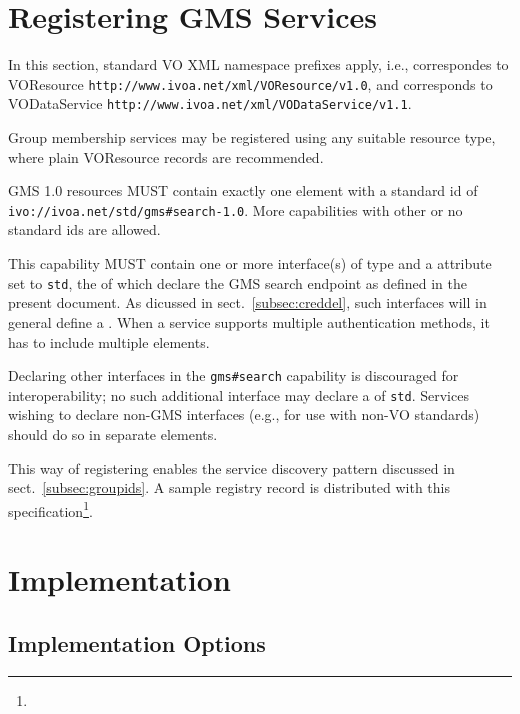 \documentclass[11pt,a4paper]{ivoa}
\begin{document}
\section{Registering GMS Services}

In this section, standard VO XML namespace prefixes apply, i.e.,
 correspondes to VOResource \citep{2018ivoa.spec.0625P}
\nolinkurl{http://www.ivoa.net/xml/VOResource/v1.0}, and
 corresponds to VODataService \citep{2010ivoa.spec.1202P}
\nolinkurl{http://www.ivoa.net/xml/VODataService/v1.1}.

Group membership services may be registered using any suitable resource type, where plain VOResource  records are recommended.

GMS 1.0 resources MUST contain exactly one  element with a standard id of \nolinkurl{ivo://ivoa.net/std/gms#search-1.0}.  More capabilities with other or no standard ids are allowed.

This capability MUST contain one or more interface(s) of type  and a  attribute set to \verb|std|, the  of which declare the GMS search endpoint as defined in the present document.  As dicussed in sect.~\ref{subsec:creddel}, such interfaces will in general define a .  When a service supports multiple authentication methods, it has to include multiple  elements.

Declaring other interfaces in the \verb|gms#search| capability is discouraged for interoperability; no such additional interface may declare a  of \verb|std|.  Services wishing to declare non-GMS interfaces (e.g., for use with non-VO standards) should do so in separate  elements.

This way of registering enables the service discovery pattern discussed in sect.~\ref{subsec:groupids}.  A sample registry record is distributed with this specification\footnote{}.


\section {Implementation}

\subsection {Implementation Options}
\label{subsec:implopts}
\end{document}
